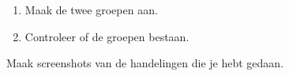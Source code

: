 \begin{enumerate}
\item Maak de twee groepen aan.
\item Controleer of de groepen bestaan.
\end{enumerate}

Maak screenshots van de handelingen die je hebt gedaan.

